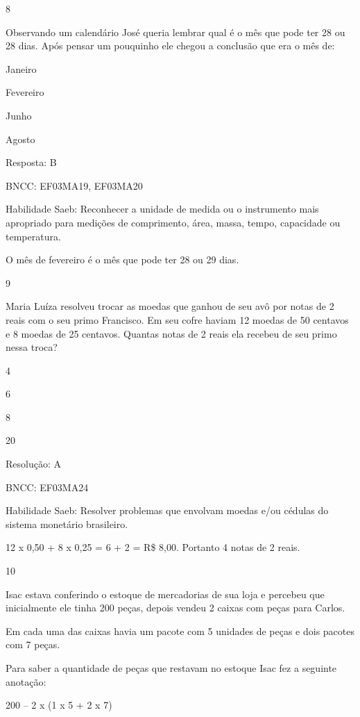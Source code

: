 \begin{escolha}
{\begin{escolha}
{\num{8}

Observando um calendário José queria lembrar qual é o mês que pode ter
28 ou 28 dias. Após pensar um pouquinho ele chegou a conclusão que era o
mês de:

\begin{escolha}
\item
  Janeiro
\item
  Fevereiro
\item
  Junho
\item
  Agosto
\end{escolha}

Resposta: B

BNCC: EF03MA19, EF03MA20

Habilidade Saeb: Reconhecer a unidade de medida ou o instrumento mais
apropriado para medições de comprimento, área, massa, tempo, capacidade
ou temperatura.

O mês de fevereiro é o mês que pode ter 28 ou 29 dias.

\num{9}

Maria Luíza resolveu trocar as moedas que ganhou de seu avô por notas de
2 reais com o seu primo Francisco. Em seu cofre haviam 12 moedas de 50
centavos e 8 moedas de 25 centavos. Quantas notas de 2 reais ela recebeu
de seu primo nessa troca?

\begin{escolha}
\item
  4
\item
  6
\item
  8
\item
  20
\end{escolha}

Resolução: A

BNCC: EF03MA24

Habilidade Saeb: Resolver problemas que envolvam moedas e/ou cédulas do
sistema monetário brasileiro.

12 x 0,50 + 8 x 0,25 = 6 + 2 = R\$ 8,00. Portanto 4 notas de 2 reais.

\num{10}

Isac estava conferindo o estoque de mercadorias de sua loja e percebeu
que inicialmente ele tinha 200 peças, depois vendeu 2 caixas com peças
para Carlos.

Em cada uma das caixas havia um pacote com 5 unidades de peças e dois
pacotes com 7 peças.

Para saber a quantidade de peças que restavam no estoque Isac fez a
seguinte anotação:

200 -- 2 x (1 x 5 + 2 x 7)

}
\end{escolha}}
\end{escolha}
